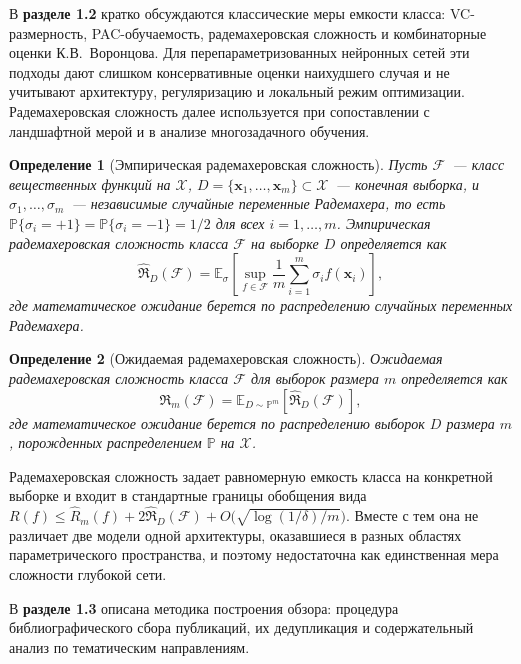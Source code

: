 \documentclass{dissert}
\newtheorem{definition}{Определение}
\begin{document}
В \textbf{разделе 1.2} кратко обсуждаются классические меры емкости класса: VC-размерность, PAC-обучаемость, радемахеровская сложность и комбинаторные оценки К.В.~Воронцова.
Для перепараметризованных нейронных сетей эти подходы дают слишком консервативные оценки наихудшего случая и не учитывают архитектуру, регуляризацию и локальный режим оптимизации.
Радемахеровская сложность далее используется при сопоставлении с ландшафтной мерой и в анализе многозадачного обучения.

\begin{definition}[Эмпирическая радемахеровская сложность]
    Пусть $\mathcal{F}$~--- класс вещественных функций на $\mathcal{X}$, $D = \{\mathbf{x}_1,\ldots,\mathbf{x}_m\} \subset \mathcal{X}$~--- конечная выборка, и $\sigma_1,\ldots,\sigma_m$~--- независимые случайные переменные Радемахера, то есть $\mathbb{P}\{\sigma_i = +1\} = \mathbb{P}\{\sigma_i = -1\} = 1/2$ для всех $i = 1,\ldots,m$. \textit{Эмпирическая радемахеровская сложность} класса $\mathcal{F}$ на выборке $D$ определяется как
    \[
        \hat{\mathfrak{R}}_D(\mathcal{F}) = \mathbb{E}_{\sigma}\left[\sup_{f \in \mathcal{F}} \frac{1}{m} \sum_{i=1}^{m} \sigma_i f(\mathbf{x}_i)\right],
    \]
    где математическое ожидание берется по распределению случайных переменных Радемахера.
\end{definition}

\begin{definition}[Ожидаемая радемахеровская сложность]
    \textit{Ожидаемая радемахеровская сложность} класса $\mathcal{F}$ для выборок размера $m$ определяется как
    \[
        \mathfrak{R}_m(\mathcal{F}) = \mathbb{E}_{D \sim \mathbb{P}^m}\left[\hat{\mathfrak{R}}_D(\mathcal{F})\right],
    \]
    где математическое ожидание берется по распределению выборок $D$ размера $m$, порожденных распределением $\mathbb{P}$ на $\mathcal{X}$.
\end{definition}

Радемахеровская сложность задает равномерную емкость класса на конкретной выборке и входит в стандартные границы обобщения вида $R(f)\le\hat{R}_m(f)+2\hat{\mathfrak{R}}_D(\mathcal{F})+O\!\bigl(\sqrt{\log(1/\delta)/m}\bigr)$.
Вместе с тем она не различает две модели одной архитектуры, оказавшиеся в разных областях параметрического пространства, и поэтому недостаточна как единственная мера сложности глубокой сети.

В \textbf{разделе 1.3} описана методика построения обзора: процедура библиографического сбора публикаций, их дедупликация и содержательный анализ по тематическим направлениям.
\end{document}
